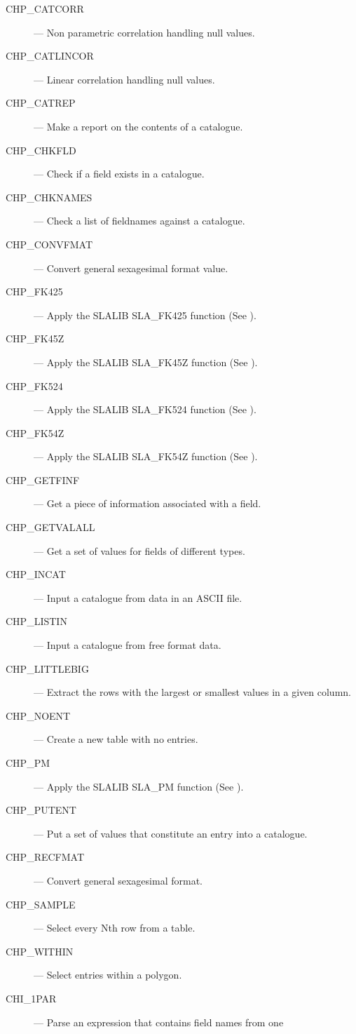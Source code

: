 \documentclass[11pt,nolof]{starlink}
\begin{document}
\begin{description}
\item [CHP\_CATCORR] ---  Non parametric correlation handling null values.
\item [CHP\_CATLINCOR] ---  Linear correlation handling null values.
\item [CHP\_CATREP] ---  Make a report on the contents of a catalogue.
\item [CHP\_CHKFLD] ---   Check if a field exists in a catalogue.
\item [CHP\_CHKNAMES] ---   Check a list of fieldnames against a catalogue.
\item [CHP\_CONVFMAT] ---   Convert general sexagesimal format value.
\item [CHP\_FK425] ---  Apply the SLALIB SLA\_FK425 function (See ).
\item [CHP\_FK45Z] ---  Apply the SLALIB SLA\_FK45Z function (See ).
\item [CHP\_FK524] ---  Apply the SLALIB SLA\_FK524 function (See ).
\item [CHP\_FK54Z] ---  Apply the SLALIB SLA\_FK54Z function (See ).
\item [CHP\_GETFINF] ---  Get a piece of information associated with a field.
\item [CHP\_GETVALALL] ---  Get a set of values for fields of different types.
\item [CHP\_INCAT] ---  Input a catalogue from data in an ASCII file.
\item [CHP\_LISTIN] ---  Input a catalogue from free format data.
\item [CHP\_LITTLEBIG] ---  Extract the rows with the largest or smallest
values in a given column.
\item [CHP\_NOENT] ---  Create a new table with no entries.
\item [CHP\_PM] ---  Apply the SLALIB SLA\_PM function (See ).
\item [CHP\_PUTENT] ---  Put a set of values that constitute an entry into a
catalogue.
\item [CHP\_RECFMAT] ---  Convert general sexagesimal format.
\item [CHP\_SAMPLE] ---  Select every Nth row from a table.
\item [CHP\_WITHIN] ---  Select entries within a polygon.
\item [CHI\_1PAR] ---  Parse an expression that contains field names from one

\end{description}
\end{document}
